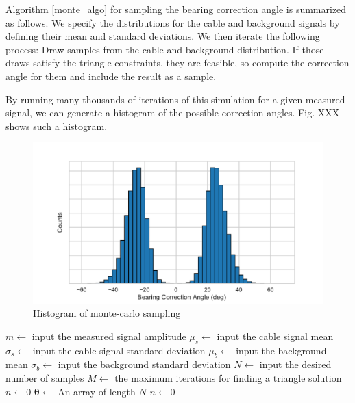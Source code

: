 \documentclass[paper=a4, fontsize=11pt]{scrartcl}
\numberwithin{equation}{section}		%
\numberwithin{figure}{section}			%
\numberwithin{table}{section}				%
\begin{document}
\begin{appendices}
Algorithm \ref{monte_algo} for sampling the bearing correction angle is summarized as follows.  We specify the distributions for the cable and background signals by defining their mean and standard deviations.  We then iterate the following process:  Draw samples from the cable and background distribution.  If those draws satisfy the triangle constraints, they are feasible, so compute the correction angle for them and include the result as a sample.  

By running many thousands of iterations of this simulation for a given measured signal, we can generate a histogram of the possible correction angles.  Fig. XXX shows such a histogram.

\begin{figure}
  \caption{Histogram of monte-carlo sampling}
  \label{fig:correction_hist}
  \centering
  \includegraphics[width=1.0\textwidth]{figures/correction_hist.pdf}
\end{figure}


% 


\begin{algorithm}[H] \label{monte_algo}
\SetAlgoLined
{}
 $m \gets$ input the measured signal amplitude\;
 $\mu_s \gets$ input the cable signal mean\;
 $\sigma_s \gets$ input the cable signal standard deviation\;
 $\mu_b \gets$ input the background mean\;
 $\sigma_b \gets$ input the background standard deviation\;
 $N \gets$ input the desired number of samples\;
 $M \gets$ the maximum iterations for finding a triangle solution\;
 $n \gets 0$\;
 $\bm{\theta} \gets$ An array of length $N$\;
 $n \gets 0$\;
\end{algorithm}
\end{appendices}
\end{document}
